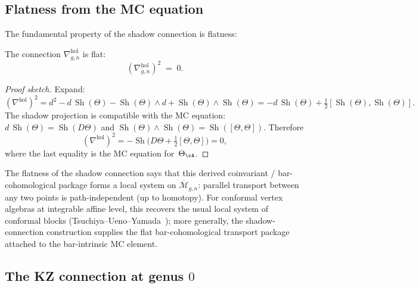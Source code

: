 \subsection{Flatness from the MC equation}
\label{subsec:thqg-intro-flatness}

The fundamental property of the shadow connection is flatness:

\begin{proposition}
\label{prop:thqg-intro-flatness}
The connection $\nabla^{\mathrm{hol}}_{g,n}$ is flat:
\begin{equation}\label{eq:thqg-intro-flatness}
(\nabla^{\mathrm{hol}}_{g,n})^2
\;=\;
0.
\end{equation}
\end{proposition}

\begin{proof}[Proof sketch]
Expand:
\[
(\nabla^{\mathrm{hol}})^2
= d^2 - d\,\operatorname{Sh}(\Theta) - \operatorname{Sh}(\Theta) \wedge d
+ \operatorname{Sh}(\Theta) \wedge \operatorname{Sh}(\Theta)
= -d\,\operatorname{Sh}(\Theta) + \tfrac{1}{2}[\operatorname{Sh}(\Theta), \operatorname{Sh}(\Theta)].
\]
The shadow projection is compatible with the MC equation:
$d\,\operatorname{Sh}(\Theta) = \operatorname{Sh}(D\Theta)$ and
$\operatorname{Sh}(\Theta) \wedge \operatorname{Sh}(\Theta)
= \operatorname{Sh}([\Theta, \Theta])$. Therefore
\[
(\nabla^{\mathrm{hol}})^2
= -\operatorname{Sh}\bigl(D\Theta + \tfrac{1}{2}[\Theta, \Theta]\bigr)
= 0,
\]
where the last equality is the MC equation for~$\Theta_\cA$.
\end{proof}

The flatness of the shadow connection says that this derived
coinvariant / bar-cohomological package forms a local system on
$\overline{\mathcal{M}}_{g,n}$: parallel transport between any two
points is path-independent (up to homotopy). For conformal vertex
algebras at integrable affine level, this recovers the usual local
system of conformal blocks
(Tsuchiya--Ueno--Yamada~\cite{TUY89}); more generally, the
shadow-connection construction supplies the flat bar-cohomological
transport package attached to the bar-intrinsic MC element.

\subsection{The KZ connection at genus $0$}
\label{subsec:thqg-intro-kz-genus0}

